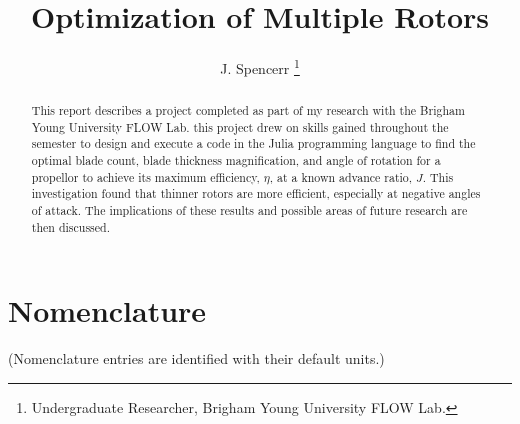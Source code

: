 \documentclass[journal ]{new-aiaa}
\title{Optimization of Multiple Rotors}
\author{J. Spencerr \footnote{Undergraduate Researcher, Brigham Young University FLOW Lab.}}
\affil{Brigham Young University, Provo, Utah, 84601} %
\begin{document}
\maketitle

\begin{abstract}
This report describes a project completed as part of my research with the Brigham Young University FLOW Lab. this project drew on skills gained throughout the semester to design and execute a code in the Julia programming language to find the optimal blade count, blade thickness magnification, and angle of rotation for a propellor to achieve its maximum efficiency, $\eta$, at a known advance ratio, $J$. This investigation found that thinner rotors are more efficient, especially at negative angles of attack. The implications of these results and possible areas of future research are then discussed.

\end{abstract}


\section*{Nomenclature}

\noindent(Nomenclature entries are identified with their default units.)
\end{document}
